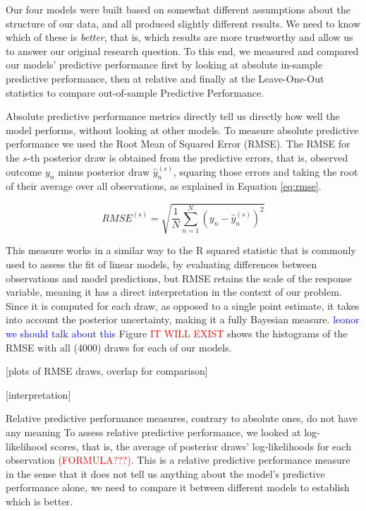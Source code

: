 \documentclass[12pt]{article}
\newcommand{\red}[1]{\textcolor{red}{#1}}
\newcommand{\blue}[1]{\textcolor{blue}{#1}}
\begin{document}
Our four models were built based on somewhat different assumptions about the structure of our data, and all produced slightly different results. We need to know which of these is \textit{better}, that is, which results are more trustworthy and allow us to answer our original research question.
To this end, we measured and compared our models' predictive performance first by looking at absolute in-sample predictive performance, then at relative and finally at the Leave-One-Out statistics to compare out-of-sample Predictive Performance.


Absolute predictive performance metrics directly tell us directly how well the model performs, without looking at other models.
To measure absolute predictive performance we used the Root Mean of Squared Error (RMSE). The RMSE for the $s$-th posterior draw is obtained from the predictive errors, that is, observed outcome $y_n$ minus posterior draw $\hat{y}_n^{(s)}$, squaring those errors and taking the root of their average over all observations, as explained in Equation \ref{eq:rmse}. 

\begin{equation} \label{eq:rmse}
	RMSE^{(s)} = \sqrt{
		\frac{1}{N} 
		\sum_{n = 1}^{N}
		\left( y_n - \hat{y}_n^{(s)} \right)^2
		}
\end{equation}

This measure works in a similar way to the R squared statistic that is commonly used to assess the fit of linear models, by evaluating differences between observations and model predictions, but RMSE retains the scale of the response variable, meaning it has a direct interpretation in the context of our problem.
Since it is computed for each draw, as opposed to a single point estimate, it takes into account the posterior uncertainty, making it a fully Bayesian measure.
\blue{leonor we should talk about this}
Figure \red{IT WILL EXIST} shows the histograms of the RMSE with all (4000) draws for each of our models.

[plots of RMSE draws, overlap for comparison]

[interpretation]


Relative predictive performance measures, contrary to absolute ones, do not have any meaning 
To assess relative predictive performance, we looked at log-likelihood scores, that is, the average of posterior draws' log-likelihoods for each observation
\textcolor{red}{(FORMULA???)}. 
This is a relative predictive performance measure in the sense that it does not tell us anything about the model's predictive performance alone, we need to compare it between different models to establish which is better.
 
\end{document}
